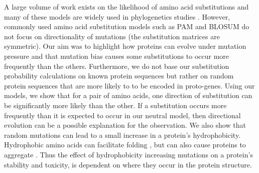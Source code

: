 \documentclass[12pt,a4paper]{article}
\begin{document}
A large volume of work exists on the likelihood of amino acid substitutions and many of these models are widely used in phylogenetics studies \citep{aasubOhta,PAM,blosum,submat92,submat92j,submat01,submat05,submat07,submat08}. However, commonly used amino acid substitution models such as PAM and BLOSUM \citep{PAM,blosum} do not focus on directionality of mutations (the substitution matrices are symmetric). Our aim was to highlight how proteins can evolve under mutation pressure and that mutation bias causes some substitutions to occur more frequently than the others. Furthermore, we do not base our substitution probability calculations on known protein sequences but rather on random protein sequences that are more likely to to be encoded in proto-genes. Using our models, we show that for a pair of amino acids, one direction of substitution can be significantly more likely than the other. If a substitution occurs more frequently than it is expected to occur in our neutral model, then directional evolution can be a possible explanation for the observation. We also show that random mutations can lead to a small increase in a protein's hydrophobicity. Hydrophobic amino acids can facilitate folding \citep{Dill1985}, but can also cause proteins to aggregate \citep{hydrophobicRatchet}. Thus the effect of hydrophobicity increasing mutations on a protein's stability and toxicity, is dependent on where they occur in the protein structure.
\end{document}
